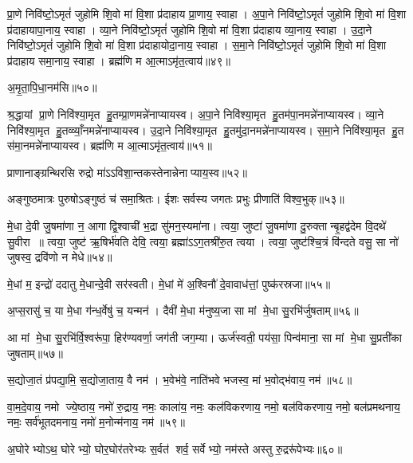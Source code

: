 प्रा॒णे निवि॑ष्टो॒ऽमृतं॑ जुहोमि शि॒वो मा॑ वि॒शा प्र॑दाहाय प्रा॒णाय॒ स्वाहा। अ॒पा॒ने निवि॑ष्टो॒ऽमृतं॑ जुहोमि शि॒वो मा॑ वि॒शा प्र॑दाहायापा॒नाय॒ स्वाहा। व्या॒ने निवि॑ष्टो॒ऽमृतं॑ जुहोमि शि॒वो मा॑ वि॒शा प्र॑दाहाय व्या॒नाय॒ स्वाहा। उ॒दा॒ने निवि॑ष्टो॒ऽमृतं॑ जुहोमि शि॒वो मा॑ वि॒शा प्र॑दाहायोदा॒नाय॒ स्वाहा। स॒मा॒ने निवि॑ष्टो॒ऽमृतं॑ जुहोमि शि॒वो मा॑ वि॒शा प्र॑दाहाय समा॒नाय॒ स्वाहा। ब्रह्म॑णि म आ॒त्माऽमृ॑त॒त्वाय॑॥४९॥
\anuvakamend


अ॒मृ॒ता॒पि॒धा॒नम॑सि॥५०॥
\anuvakamend


श्र॒द्धायां प्रा॒णे निवि॑श्या॒मृत हु॒तम्प्रा॒णमन्ने॑नाप्यायस्व। अ॒पा॒ने निवि॑श्या॒मृत हु॒तम॑पा॒नमन्ने॑नाप्यायस्व। व्या॒ने निवि॑श्या॒मृत हु॒तव्व्याँ॒नमन्ने॑नाप्यायस्व। उ॒दा॒ने निवि॑श्या॒मृत हु॒तमु॑दा॒नमन्ने॑नाप्यायस्व। स॒मा॒ने निवि॑श्या॒मृत हु॒त स॑मा॒नमन्ने॑नाप्यायस्व। ब्रह्म॑णि म आ॒त्माऽमृ॑त॒त्वाय॑॥५१॥
\anuvakamend


प्राणानाङ्ग्रन्थिरसि रुद्रो मा॑ऽऽविशा॒न्तकस्तेनान्नेनाप्याय॒स्व॥५२॥
\anuvakamend


अङ्गुष्ठमात्रः पुरुषोऽङ्गुष्ठं च॑ समा॒श्रितः। ईशः सर्वस्य जगतः प्रभुः प्रीणाति॑ विश्व॒भुक्॥५३॥
\anuvakamend


मे॒धा दे॒वी जु॒षमा॑णा न॒ आगाद्वि॒श्वाची॑ भ॒द्रा सु॑मन॒स्यमा॑ना। त्वया॒ जुष्टा॑ जु॒षमा॑णा दु॒रुक्तान्बृ॒हद्व॑देम वि॒दथे॑ सु॒वीरा॥ त्वया॒ जुष्ट॑ ऋ॒षिर्भ॑वति देवि॒ त्वया॒ ब्रह्मा॑ऽऽग॒तश्री॑रु॒त त्वया। त्वया॒ जुष्ट॑श्चि॒त्रं  वि॑न्दते वसु॒ सा नो॑ जुषस्व॒ द्रवि॑णो न मेधे॥५४॥
\anuvakamend


मे॒धां म॒ इन्द्रो॑ ददातु मे॒धान्दे॒वी सर॑स्वती। मे॒धां मे॑ अ॒श्विनौ॑ दे॒वावाध॑त्तां॒ पुष्क॑रस्रजा॥५५॥
\anuvakamend


अ॒प्स॒रासु॑ च॒ या मे॒धा ग॑न्ध॒र्वेषु॑ च॒ यन्मन॑। दैवी॑ मे॒धा म॑नुष्य॒जा सा मां मे॒धा सु॒रभि॑र्जुषताम्॥५६॥
\anuvakamend


आ मां मे॒धा सु॒रभि॑र्वि॒श्वरू॑पा॒ हिर॑ण्यवर्णा॒ जग॑ती जग॒म्या। ऊर्ज॑स्वती॒ पय॑सा॒ पिन्व॑माना॒ सा मां मे॒धा सु॒प्रती॑का जुषताम्॥५७॥
\anuvakamend


स॒द्योजा॒तं प्र॑पद्या॒मि॒ स॒द्योजा॒ताय॒ वै नम॑। भ॒वेभ॑वे॒ नाति॑भवे भजस्व॒ मां भ॒वोद्भ॑वाय॒ नम॑॥५८॥
\anuvakamend


वा॒म॒दे॒वाय॒ नमो ज्ये॒ष्ठाय॒ नमो॑ रु॒द्राय॒ नमः॒ काला॑य॒ नमः॒ कल॑विकरणाय॒ नमो॒ बल॑विकरणाय॒ नमो॒ बल॑प्रमथनाय॒ नमः॒ सर्व॑भूतदमनाय॒ नमो॑ म॒नोन्म॑नाय॒ नम॑॥५९॥
\anuvakamend


अ॒घोरेभ्योऽथ॒ घोरेभ्यो॒ घोर॒घोर॑तरेभ्यः स॒र्वत॑ शर्व॒ सर्वेभ्यो॒ नम॑स्ते अस्तु रु॒द्ररू॑पेभ्यः॥६०॥
\anuvakamend



